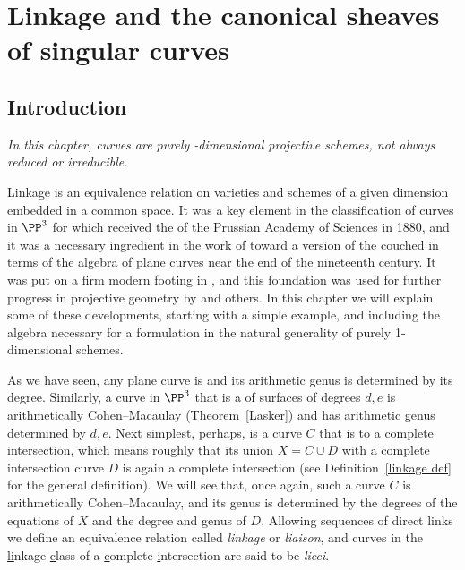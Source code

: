 

\chapter{Linkage and the canonical sheaves of singular curves}
\label{LiaisonChapter}\label{linkageChapter}\label{LinkageChapter}


\section{Introduction} \label{LinkageIntro}

\emph{In this chapter, curves are purely \1-dimensional projective
schemes, 
not always
reduced or irreducible.}

Linkage is an equivalence relation on varieties and schemes of a given
dimension embedded in a common space. It was a key element
in the classification of curves in $\PP^3$ for which
%
%
received the
%
of the Prussian
Academy of Sciences in 1880, and it was a necessary ingredient in the
work of
toward
%
%
%
%
a version of the
couched in terms of the algebra
of plane curves near the end of the nineteenth century.
It was put on a firm modern footing in \cite{MR364271}, and this
%
%
%
%
%
%
foundation was used for further progress in projective geometry by
and others. In this chapter we will explain some of
these developments, starting with a simple example,
%
and including the algebra necessary for a formulation in the natural
generality of purely 1-dimensional schemes.

As we have seen, any plane curve is
%
and
its arithmetic genus is determined by its degree. Similarly, a curve in
$\PP^3$ that is a 
%
of surfaces of degrees $d,e$
is arithmetically Cohen--Macaulay (Theorem~\ref{Lasker}) and has
arithmetic genus determined by $d,e$.
Next simplest, perhaps,
%
is a curve $C$ that is
to a complete intersection,
which means roughly that its union $X = C\cup D$
with a complete intersection
curve $D$ is again a complete intersection
(see Definition~\ref{linkage def} for the general definition).
We will see that, once again, such a
curve $C$ is arithmetically Cohen--Macaulay,
and its genus is determined by the degrees of the equations of $X$
and the degree and genus of $D$.
Allowing sequences of direct links we define an equivalence relation
%
%
%
called  \emph{linkage} or \emph{liaison},
and curves in the \underline{li}nkage {\underline c}lass of a {\underline
c}omplete {\underline i}ntersection are
said to be
\emph{licci}.

